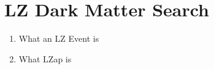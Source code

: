 \section{LZ Dark Matter Search}
\begin{enumerate}
    \item What an LZ Event is
    \item What LZap is
\end{enumerate}
